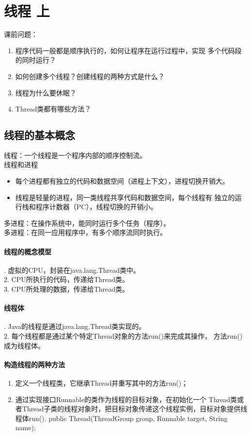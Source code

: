 \chapter{线程 上}
课前问题：
\begin{enumerate}
	\item 程序代码一般都是顺序执行的，如何让程序在运行过程中，实现
	多个代码段的同时运行？
	\item 如何创建多个线程？创建线程的两种方式是什么？
	\item 线程为什么要休眠？
	\item Thread类都有哪些方法？
\end{enumerate}
\section{线程的基本概念}
\noindent 线程：一个线程是一个程序内部的顺序控制流。
\\线程和进程
\begin{itemize}
	\item 每个进程都有独立的代码和数据空间（进程上下文），进程切换开销大。
	\item 线程是轻量的进程，同一类线程共享代码和数据空间，每个线程有
	独立的运行栈和程序计数器（PC），线程切换的开销小。
\end{itemize}
\noindent 多进程：在操作系统中，能同时运行多个任务（程序）。
\\多进程：在同一应用程序中，有多个顺序流同时执行。
\subsubsection{线程的概念模型}
. 虚拟的CPU，封装在java.lang.Thread类中。
\\2. CPU所执行的代码，传递给Thread类。
\\3. CPU所处理的数据，传递给Thread类。
\subsubsection{线程体}
. Java的线程是通过java.lang.Thread类实现的。
\\2. 每个线程都是通过某个特定Thread对象的方法run()来完成其操作，
方法run()成为线程体。
\subsubsection{构造线程的两种方法}
\begin{enumerate}
	\item 定义一个线程类，它继承Thread并重写其中的方法run()；
	\item 通过实现接口Runnable的类作为线程的目标对象，在初始化一个
	Thread类或者Thread子类的线程对象时，把目标对象传递这个线程实例，目标对象提供线程体run().
	\subitem public Thread(ThreadGroup group, Runnable target, String name);
\end{enumerate}

